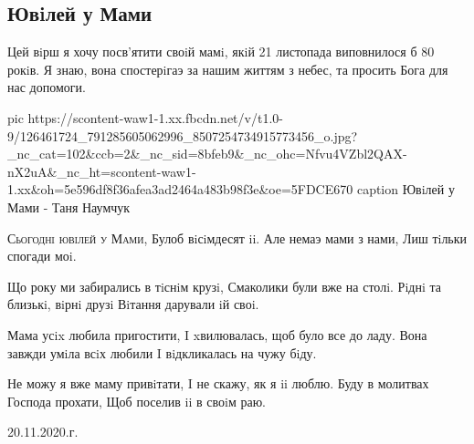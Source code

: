  
 
 

\subsection{Ювiлей у Мами}

Цей вiрш я хочу посв'ятити своiй мамi, якiй 21 листопада виповнилося б 80
рокiв.  Я знаю, вона спостерiгаэ за нашим життям з небес, та просить Бога для
нас допомоги.

\ifcmt
pic https://scontent-waw1-1.xx.fbcdn.net/v/t1.0-9/126461724_791285605062996_8507254734915773456_o.jpg?_nc_cat=102&ccb=2&_nc_sid=8bfeb9&_nc_ohc=Nfvu4VZbl2QAX-nX2uA&_nc_ht=scontent-waw1-1.xx&oh=5e596df8f36afea3ad2464a483b98f3e&oe=5FDCE670
caption Ювiлей у Мами - Таня Наумчук
\fi

\begin{multicols}{2}
\obeycr
\lettrine[lines=2]{С}{ьогоднi ювiлей у Мами},
Булоб вiсiмдесят ii.
Але немаэ мами з нами,
Лиш тiльки спогади моi.

Що року ми забирались в тiснiм крузi,
Смаколики були вже на столi.
Рiднi та близькi, вiрнi друзi
Вiтання дарували iй своi.
\columnbreak

Мама усix любила пригостити,
I xвилювалась, щоб було все до ладу.
Вона завжди умiла всiх любили
I вiдкликалась на чужу бiду.

Не можу я вже маму привiтати,
I не скажу, як я ii люблю.
Буду в молитвах Господа прохати,
Щоб поселив ii в своiм раю.

20.11.2020.г.

\restorecr
\end{multicols}
